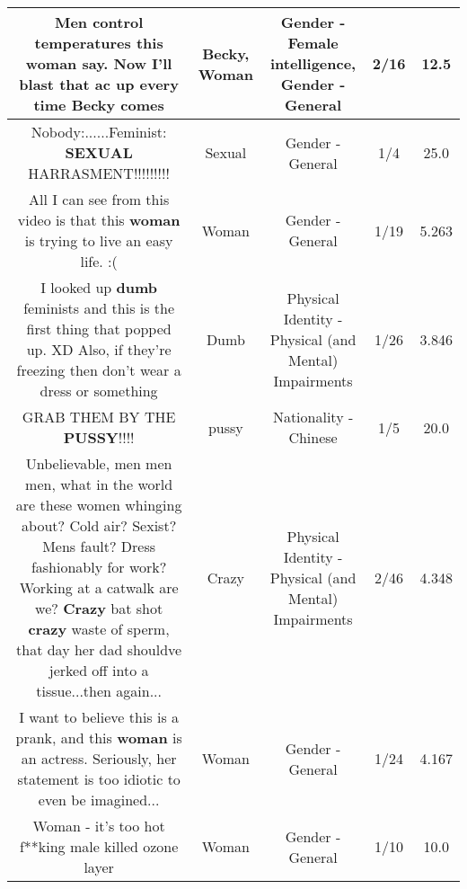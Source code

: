 \documentclass[11pt]{article}
\newlength\mylength
\begin{document}
\begin{center}
\begin{longtable}{|C{.65\mylength}|C{.30\mylength}|C{.12\mylength}|C{.12\mylength}|C{.12\mylength}|}
  \small Men control temperatures this \textbf{woman} say. Now I'll blast that ac up every time \textbf{Becky} comes\normalsize   & Becky, Woman & Gender - Female intelligence, Gender - General & 2/16 & 12.5 \\  \hline
  \small Nobody:......Feminist: \textbf{SEXUAL} HARRASMENT!!!!!!!!!\normalsize   & Sexual & Gender - General & 1/4 & 25.0 \\  \hline
  \small All I can see from this video is that this \textbf{woman} is trying to live an easy life. :(\normalsize   & Woman & Gender - General & 1/19 & 5.263 \\  \hline
  \small I looked up \textbf{dumb} feminists and this is the first thing that popped up. XD Also, if they're freezing then don't wear a dress or something\normalsize   & Dumb & Physical Identity - Physical (and Mental) Impairments & 1/26 & 3.846 \\  \hline
  \small GRAB THEM BY THE \textbf{PUSSY}!!!!\normalsize   & pussy & Nationality - Chinese & 1/5 & 20.0 \\  \hline
  \small Unbelievable,  men men men, what in the world are these women whinging about? Cold air? Sexist? Mens fault? Dress fashionably for work? Working at a catwalk are we? \textbf{Crazy} bat shot \textbf{crazy} waste of sperm, that day her dad shouldve jerked off into a tissue...then again...\normalsize   & Crazy & Physical Identity - Physical (and Mental) Impairments & 2/46 & 4.348 \\  \hline
  \small I want to believe this is a prank, and this \textbf{woman} is an actress. Seriously, her statement is too idiotic to even be imagined...\normalsize   & Woman & Gender - General & 1/24 & 4.167 \\  \hline
  \small Woman - it's too hot f**king male killed ozone layer\normalsize   & Woman & Gender - General & 1/10 & 10.0 \\  \hline

\end{longtable}
\end{center}
\end{document}
